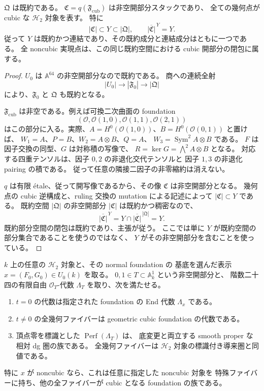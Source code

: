 \begin{proposition}[実現点集合の既約性]
\label{prop:h2-component-density}
$\mathfrak Q$ は既約である。
$\mathfrak C=q(\mathfrak F_{\mathrm{cub}})$ は非空開部分スタックであり、
全ての幾何点が cubic な $\mathcal H_2$ 対象を表す。
特に
\[
 |\mathfrak C|\subset Y\subset|\mathfrak Q|,
 \qquad
 \overline{|\mathfrak C|}^{\,Y}=Y.
\]
従って $Y$ は既約かつ連結であり、その既約成分と連結成分はともに一つである。
全 noncubic 実現点は、この同じ既約空間における cubic 開部分の閉包に属する。
\end{proposition}

\begin{proof}
$U_0$ は $\mathbb A^{64}$ の非空開部分なので既約である。
商への連続全射\cite[Tags 04XL, 0DR5]{StacksModuli}
\[
 |U_0|\longrightarrow|\mathfrak F_0|
       \longrightarrow|\mathfrak Q|
\]
により、$\mathfrak F_0$ と $\mathfrak Q$ も既約となる。

$\mathfrak F_{\mathrm{cub}}$ は非空である。例えば可換二次曲面の foundation
\[
 (\mathcal O,\mathcal O(1,0),\mathcal O(1,1),\mathcal O(2,1))
\]
はこの部分に入る。実際、$A=H^0(\mathcal O(1,0))$、$B=H^0(\mathcal O(0,1))$ と置けば、
$W_1=A$、$P=B$、$W_2=A\otimes B$、$Q=A$、
$W_3=\operatorname{Sym}^2A\otimes B$ である。
$F$ は因子交換の同型、$G$ は対称積の写像で、
$R=\ker G=\bigwedge^2A\otimes B$ となる。
対応する四重テンソルは、因子 $0,2$ の非退化交代テンソルと
因子 $1,3$ の非退化 pairing の積である。
従って任意の隣接二因子の非零縮約は消えない。

$q$ は有限 \'etale、従って開写像であるから、その像 $\mathfrak C$ は非空開部分となる。
幾何点の cubic 逆構成と、ruling 交換の mutation による記述によって
$|\mathfrak C|\subset Y$ である。
既約空間 $|\mathfrak Q|$ の非空開部分 $|\mathfrak C|$ は既約かつ稠密なので、
\[
 \overline{|\mathfrak C|}^{\,Y}
 =Y\cap\overline{|\mathfrak C|}^{\,|\mathfrak Q|}=Y.
\]
既約部分空間の閉包は既約であり、主張が従う。
ここでは単に $Y$ が既約空間の部分集合であることを使うのではなく、
$Y$ がその非空開部分を含むことを使っている。
\end{proof}

\begin{proposition}
\label{prop:h2-line-degeneration}
$k$ 上の任意の $\mathcal H_2$ 対象と、その normal foundation の
基底を選んだ表示 $x=(F_0,G_0)\in U_0(k)$ を取る。
$0,1\in T\subset\mathbb A^1_k$ という非空開部分と、
階数二十四の有限自由 $\mathcal O_T$-代数 $\Lambda_T$ を取り、次を満たせる。
\begin{enumerate}
\item $t=0$ の代数は指定された foundation の End 代数 $\Lambda_x$ である。
\item $t\ne0$ の全幾何ファイバーは geometric cubic foundation の代数である。
\item 頂点零を標識とした $\operatorname{Perf}(\Lambda_T)$ は、
      底変更と両立する smooth proper な相対 dg 圏の族である。
      全幾何ファイバーは $\mathcal H_2$ 対象の標識付き導来圏と同値である。
\end{enumerate}
特に $x$ が noncubic なら、これは任意に指定した noncubic 対象を
特殊ファイバーに持ち、他の全ファイバーが cubic となる foundation の族である。
\end{proposition}

